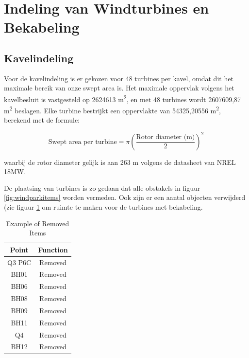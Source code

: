 \section{Indeling van Windturbines en Bekabeling}
\subsection{Kavelindeling}
Voor de kavelindeling is er gekozen voor 48 turbines per kavel, omdat dit het maximale bereik van onze swept area is. Het maximale oppervlak volgens het kavelbesluit is vastgesteld op 2624613 m\textsuperscript{2}, en met 48 turbines wordt 2607609,87 m\textsuperscript{2} beslagen. Elke turbine bestrijkt een oppervlakte van 54325,20556 m\textsuperscript{2}, berekend met de formule:

\begin{equation} \label{eq:25}
\text{{Swept area per turbine}} = \pi \left(\frac{{\text{{Rotor diameter (m)}}}}{2}\right)^2
\end{equation}

waarbij de rotor diameter gelijk is aan 263 m volgens de datasheet van NREL 18MW.

De plaatsing van turbines is zo gedaan dat alle obstakels in figuur \ref{fig:windparkitems} worden vermeden. Ook zijn er een aantal objecten verwijderd (zie figuur \ref{tab:removed-items} om ruimte te maken voor de turbines met bekabeling.
\begin{table}[h]
    \centering
    \begin{tabular}{|c|c|}
        \hline
        \textbf{Point} & \textbf{Function} \\
        \hline
        Q3 P6C & Removed \\
        \hline
        BH01 & Removed \\
        \hline
        BH06 & Removed \\
        \hline
        BH08 & Removed \\
        \hline
        BH09 & Removed \\
        \hline
        BH11 & Removed \\
        \hline
        Q4 & Removed \\
        \hline
        BH12 & Removed \\
        \hline
    \end{tabular}
    \caption{Example of Removed Items}
    \label{tab:removed-items}
\end{table}

